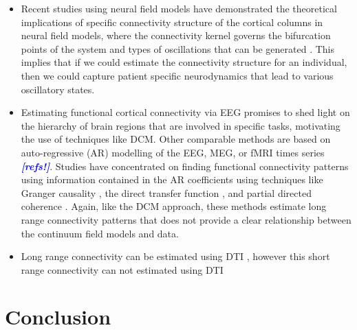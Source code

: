 \documentclass[12pt]{iopart}
\newcommand{\todo}[1]{\textsf{\emph{\textbf{\textcolor{blue}{#1}}}}}
\begin{document}
\begin{itemize}
	\item Recent studies using neural field models have demonstrated the theoretical implications of specific connectivity structure of the cortical columns in neural field models, where the connectivity kernel governs the bifurcation points of the system \cite{Hutt2005} and types of oscillations that can be generated \cite{Schmidt2009}. This implies that if we could estimate the connectivity structure for an individual, then we could capture patient specific neurodynamics that lead to various oscillatory states.
	\item Estimating functional cortical connectivity via EEG promises to shed light on the hierarchy of brain regions that are involved in specific tasks, motivating the use of techniques like DCM. Other comparable methods are based on auto-regressive (AR) modelling of the EEG, MEG, or fMRI times series \todo{[refs!]}. Studies have concentrated on finding functional connectivity patterns using information contained in the AR coefficients using techniques like Granger causality \cite{Hesse2003}, the direct transfer function \cite{Kaminski1991}, and partial directed coherence \cite{Sameshima1999}. Again, like the DCM approach, these methods estimate long range connectivity patterns that does not provide a clear relationship between the continuum field models and data.
	\item Long range connectivity can be estimated using DTI \cite{Knock2009}, however this short range connectivity can not estimated using DTI
\end{itemize}

\section{Conclusion}\label{ConclusionSection}
\appendix 
\end{document}

